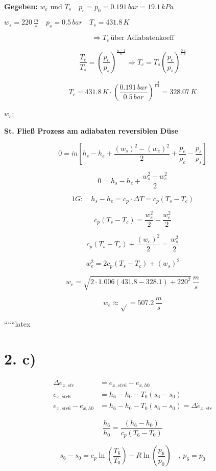 \textbf{Gegeben:} $w_e$ und $T_s \quad p_e = p_0 = 0.191 \, bar = 19.1 \, kPa$

$w_s = 220 \, \frac{m}{s} \quad p_s = 0.5 \, bar \quad T_s = 431.8 \, K$

\[
\Rightarrow T_c \, \text{über Adiabatenkoeff}
\]

\[
\frac{T_c}{T_s} = \left( \frac{p_c}{p_s} \right)^{\frac{n-1}{n}} \Rightarrow T_c = T_s \left( \frac{p_c}{p_s} \right)^{\frac{0.4}{1.4}}
\]

\[
T_c = 431.8 \, K \cdot \left( \frac{0.191 \, bar}{0.5 \, bar} \right)^{\frac{0.4}{1.4}} = 328.07 \, K
\]

\underline{$w_e$:}

\textbf{St. Fließ Prozess am adiabaten reversiblen Düse}

\[
0 = \dot{m} \left[ h_s - h_e + \frac{(w_s)^2 - (w_e)^2}{2} + \frac{p_e}{\rho_e} - \frac{p_s}{\rho_s} \right]
\]

\[
0 = h_s - h_e + \frac{w_s^2 - w_e^2}{2}
\]

\[
1G: \quad h_s - h_e = c_p \cdot \Delta T = c_p (T_s - T_c)
\]

\[
c_p (T_s - T_c) = \frac{w_s^2}{2} - \frac{w_e^2}{2}
\]

\[
c_p (T_s - T_c) + \frac{(w_e)^2}{2} = \frac{w_s^2}{2}
\]

\[
w_e^2 = 2 c_p (T_s - T_c) + (w_s)^2
\]

\[
w_e = \sqrt{2 \cdot 1.006 \left( 431.8 - 328.1 \right) + 220^2} \, \frac{m}{s}
\]

\[
w_e \approx \sqrt{\boxed{}} = \underline{507.2 \, \frac{m}{s}}
\]

``````latex


\section*{2. c)}

\begin{align*}
\Delta e_{x,str} &= e_{x,str6} - e_{x,h0} \\
e_{x,str6} &= h_6 - h_0 - T_0 (s_6 - s_0) \\
e_{x,str6} - e_{x,h0} &= h_6 - h_0 - T_0 (s_6 - s_0) = \Delta \dot{e}_{x,str}
\end{align*}

\[
\frac{h_6}{h_0} = \frac{(h_6 - h_0)}{c_p (T_6 - T_0)}
\]

\[
s_6 - s_0 = c_p \ln \left( \frac{T_6}{T_0} \right) - R \ln \left( \frac{p_6}{p_0} \right) \quad \text{, } p_6 = p_0
\]

